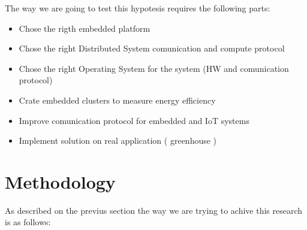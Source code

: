 The way we are going to test this hypotesis requires the following parts:


\begin{itemize}
\item Chose the rigth embedded platform 
\item Chose the right Distributed System comunication and compute protocol
\item Chose the right Operating System for the system (HW and comunication protocol) 
\item Crate embedded clusters to measure energy efficiency
\item Improve comunication protocol for embedded and IoT systems
\item Implement solution on real application ( greenhouse )
\end{itemize}

\section{Methodology}
\noindent

As described on the previus section the way we are trying to achive this
research is as follows: 


